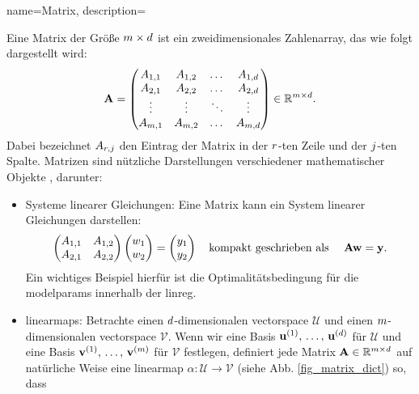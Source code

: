 {
  name={Matrix},
  description={Eine Matrix der Größe $m \times d$ ist ein zweidimensionales Zahlenarray, 
    das wie folgt dargestellt wird:
    $$
    {\bf A} = \begin{pmatrix}
      A_{1,1} & A_{1,2} & \dots  & A_{1,d} \\
      A_{2,1} & A_{2,2} & \dots  & A_{2,d} \\
      \vdots  & \vdots  & \ddots & \vdots \\
      A_{m,1} & A_{m,2} & \dots  & A_{m,d}
    \end{pmatrix} \in \mathbb{R}^{m \times d}.
    $$
    Dabei bezeichnet $A_{r,j}$ den Eintrag der Matrix in der $r$-ten Zeile 
    und der $j$-ten Spalte. Matrizen sind nützliche Darstellungen verschiedener mathematischer Objekte \cite{StrangLinAlg2016}, 
    darunter:
    \begin{itemize}
      \item Systeme linearer Gleichungen: Eine Matrix kann ein System linearer Gleichungen darstellen:
      $$
      \begin{pmatrix}
        A_{1,1} & A_{1,2} \\
        A_{2,1} & A_{2,2}
      \end{pmatrix}
      \begin{pmatrix}
        w_1 \\
        w_2
      \end{pmatrix}
      =
      \begin{pmatrix}
        y_1 \\
        y_2
      \end{pmatrix}
      \quad \text{kompakt geschrieben als } \quad {\bf A} {\bf w} = {\bf y}.
      $$
      Ein wichtiges Beispiel hierfür ist die Optimalitätsbedingung für die 
      \glspl{modelparam} innerhalb der \gls{linreg}.
      \item \Glspl{linearmap}: 
      Betrachte einen $d$-dimensionalen \gls{vectorspace} $\mathcal{U}$ und einen $m$-dimensionalen \gls{vectorspace} $\mathcal{V}$. 
      Wenn wir eine Basis $\mathbf{u}^{(1)},\,\ldots,\,\mathbf{u}^{(d)}$ für $\mathcal{U}$ und eine Basis 
      $\mathbf{v}^{(1)},\,\ldots,\,\mathbf{v}^{(m)}$ für $\mathcal{V}$ festlegen, definiert jede Matrix 
      ${\bf A} \in \mathbb{R}^{m \times d}$ auf natürliche Weise eine 
      \gls{linearmap} $\alpha: \mathcal{U} \rightarrow \mathcal{V}$ (siehe Abb. \ref{fig_matrix_dict}) so, dass

\end{itemize}}}
